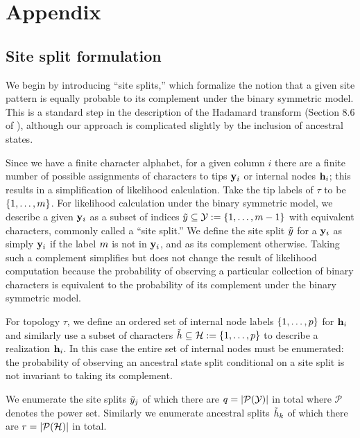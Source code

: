 \section*{Appendix}

\subsection*{Site split formulation}
We begin by introducing ``site splits,'' which formalize the notion that a given site pattern is equally probable to its complement under the binary symmetric model.
This is a standard step in the description of the Hadamard transform (Section 8.6 of \cite{Semple2003-em}), although our approach is complicated slightly by the inclusion of ancestral states.

Since we have a finite character alphabet, for a given column $i$ there are a finite number of possible assignments of characters to tips $\mathbf{y}_i$ or internal nodes $\mathbf{h}_i$; this results in a simplification of likelihood calculation.
Take the tip labels of $\tau$ to be $\{1,\ldots,m\}$.
For likelihood calculation under the binary symmetric model, we describe a given $\mathbf{y}_i$ as a subset of indices $\tilde{y}\subseteq\mathcal{Y}:=\{1,\ldots,m-1\}$ with equivalent characters, commonly called a ``site split.''
We define the site split $\tilde{y}$ for a $\mathbf{y}_i$ as simply $\mathbf{y}_i$ if the label $m$ is not in $\mathbf{y}_i$, and as its complement otherwise.
Taking such a complement simplifies but does not change the result of likelihood computation because the probability of observing a particular collection of binary characters is equivalent to the probability of its complement under the binary symmetric model.

For topology $\tau$, we define an ordered set of internal node labels $\{1,\ldots,p\}$ for $\mathbf{h}_i$ and similarly use a subset of characters $\tilde{h}\subseteq\mathcal{H}:=\{1,\ldots,p\}$ to describe a realization $\mathbf{h}_i$.
In this case the entire set of internal nodes must be enumerated: the probability of observing an ancestral state split conditional on a site split is not invariant to taking its complement.

We enumerate the site splits $\tilde{y}_j$ of which there are $q=|\mathcal{P}(\mathcal{Y})|$ in total where $\mathcal{P}$ denotes the power set.
Similarly we enumerate ancestral splits $\tilde{h}_k$ of which there are $r=|\mathcal{P}(\mathcal{H})|$ in total.

